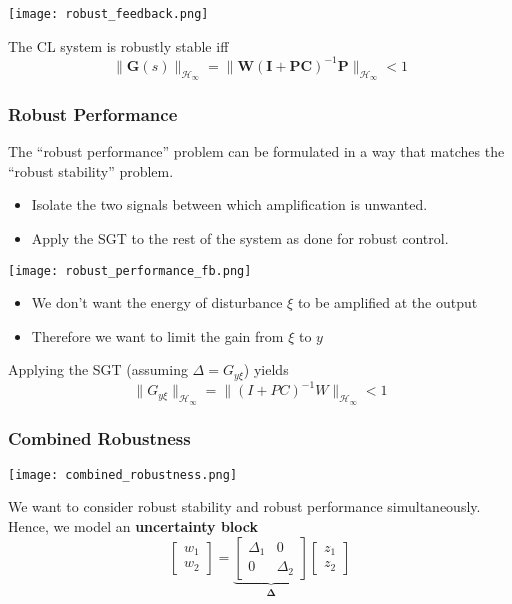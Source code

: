 \begin{center}
    \texttt{[image: robust\_feedback.png]}
\end{center}
The CL system is robustly stable iff
\begin{equation*}
    \|\mathbf{G}(s)\|_{\mathcal{H}_\infty}=\|\mathbf{W}{(\mathbf{I}+\mathbf{PC})}^{-1}\mathbf{P}\|_{\mathcal{H}_\infty}<1
\end{equation*}

\subsubsection{Robust Performance}
The “robust performance” problem can be formulated in a way that matches the “robust stability” problem.
\begin{itemize}
    \item Isolate the two signals between which amplification is unwanted.
    \item Apply the SGT to the rest of the system as done for robust control.
\end{itemize}


\begin{center}
    \texttt{[image: robust\_performance\_fb.png]}
\end{center}
\begin{itemize}
    \item We don't want the energy of disturbance $\xi$ to be amplified at the output
    \item Therefore we want to limit the gain from $\xi$ to $y$
\end{itemize}

Applying the SGT (assuming $\Delta=G_{y\xi}$) yields
\begin{equation*}
    \|G_{y\xi}\|_{\mathcal{H}_\infty}=\|(I+PC)^{-1}W\|_{\mathcal{H}_\infty}<1
\end{equation*}

\subsubsection{Combined Robustness}
\begin{center}
    \texttt{[image: combined\_robustness.png]}
\end{center}
We want to consider robust stability and robust performance simultaneously. Hence, we model an \textbf{uncertainty block}
\begin{equation*}
    \begin{bmatrix}
        w_1 \\
        w_2
    \end{bmatrix}
    =\underbrace{\begin{bmatrix}
            \Delta_1 & 0        \\
            0        & \Delta_2
        \end{bmatrix}}_{\boldsymbol{\Delta}}
    \begin{bmatrix}z_1 \\
        z_2
    \end{bmatrix}
\end{equation*}

